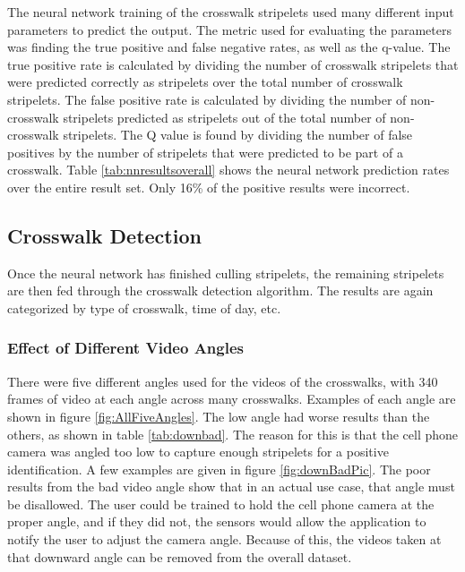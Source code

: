 \documentclass[12pt]{ucthesis}
\begin{document}
The neural network training of the crosswalk stripelets used many different input parameters to predict the output. The metric used for evaluating the parameters was finding the true positive and false negative rates, as well as the q-value. The true positive rate is calculated by dividing the number of crosswalk stripelets that were predicted correctly as stripelets over the total number of crosswalk stripelets. The false positive rate is calculated by dividing the number of non-crosswalk stripelets predicted as stripelets out of the total number of non-crosswalk stripelets. The Q value is found by dividing the number of false positives by the number of stripelets that were predicted to be part of a crosswalk. Table \ref{tab:nnresultsoverall} shows the neural network prediction rates over the entire result set. Only 16\% of the positive results were incorrect. 
    




\subsection{Crosswalk Detection}
Once the neural network has finished culling stripelets, the remaining stripelets are then fed through the crosswalk detection algorithm. The results are again categorized by type of crosswalk, time of day, etc. 

\subsubsection{Effect of Different Video Angles}

There were five different angles used for the videos of the crosswalks, with 340 frames of video at each angle across many crosswalks. Examples of each angle are shown in figure \ref{fig:AllFiveAngles}. The low angle had worse results than the others, as shown in table \ref{tab:downbad}. The reason for this is that the cell phone camera was angled too low to capture enough stripelets for a positive identification. A few examples are given in figure \ref{fig:downBadPic}. The poor results from the bad video angle show that in an actual use case, that angle must be disallowed. The user could be trained to hold the cell phone camera at the proper angle, and if they did not, the sensors would allow the application to notify the user to adjust the camera angle. Because of this, the videos taken at that downward angle can be removed from the overall dataset. 
\end{document}
